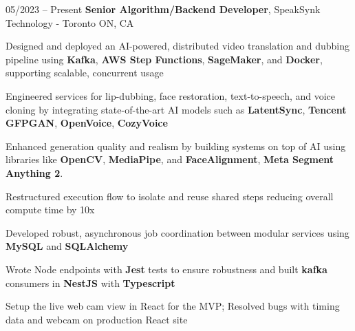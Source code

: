 \begin{twocolentry}{
    05/2023 – Present
}
\fontsize{11 pt}{11 pt}\textbf{Senior Algorithm/Backend Developer}, SpeakSynk Technology - Toronto ON, CA\end{twocolentry}

\vspace{0.10 cm}
\begin{onecolentry}
    \begin{highlights}
        \item Designed and deployed an AI-powered, distributed video translation and dubbing pipeline using \textbf{Kafka}, \newline \textbf{AWS Step Functions}, \textbf{SageMaker}, and \textbf{Docker}, supporting scalable, concurrent usage
        \item Engineered services for lip-dubbing, face restoration, text-to-speech, and voice cloning by integrating state-of-the-art AI models such as \textbf{LatentSync}, \textbf{Tencent GFPGAN}, \textbf{OpenVoice}, \textbf{CozyVoice}
        \item Enhanced generation quality and realism by building systems on top of AI using libraries like \textbf{OpenCV}, \textbf{MediaPipe}, and \textbf{FaceAlignment}, \textbf{Meta Segment Anything 2}.
        
        \ifcase\speakSynkVariant
        \relax
        \item Restructured execution flow to isolate and reuse shared steps reducing overall compute time by 10x
        \or
        \item Developed robust, asynchronous job coordination between modular services using \textbf{MySQL} and \textbf{SQLAlchemy} 
        \or
        \item Wrote Node endpoints with \textbf{Jest} tests to ensure robustness and built \textbf{kafka} consumers in \textbf{NestJS} with \textbf{Typescript}
        \or
        \item Setup the live web cam view in React for the MVP; Resolved bugs with timing data and webcam on production React site
        \fi
    \end{highlights}
\end{onecolentry}
